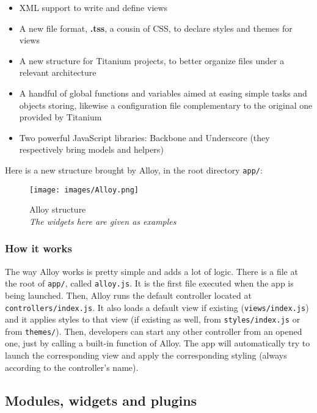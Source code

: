 \begin{itemize}
  \item XML support to write and define views
  \item A new file format, \textbf{.tss}, a cousin of CSS, to declare styles and themes for views
  \item A new structure for Titanium projects, to better organize files under a relevant architecture
  \item A handful of global functions and variables aimed at easing simple tasks and objects storing, likewise a configuration file complementary to the original one provided by Titanium
  \item Two powerful JavaScript libraries: Backbone and Underscore (they respectively bring models and helpers)
\end{itemize}

Here is a new structure brought by Alloy, in the root directory \lstinline{app/}:

\begin{figure}[!h]
   \centering\texttt{[image: images/Alloy.png]}
   \caption[Alloy structure]{Alloy structure\\\textit{The widgets here are given as examples}}
\end{figure}

\subsubsection{How it works}

The way Alloy works is pretty simple and adds a lot of logic. There is a file at the root of \lstinline{app/}, called \lstinline{alloy.js}. It is the first file executed when the app is being launched. Then, Alloy runs the default controller located at \lstinline{controllers/index.js}. It also loads a default view if existing (\lstinline{views/index.js}) and it applies styles to that view (if existing as well, from \lstinline{styles/index.js} or from \lstinline{themes/}). Then, developers can start any other controller from an opened one, just by calling a built-in function of Alloy. The app will automatically try to launch the corresponding view and apply the corresponding styling (always according to the controller's name).

\subsection{Modules, widgets and plugins}

